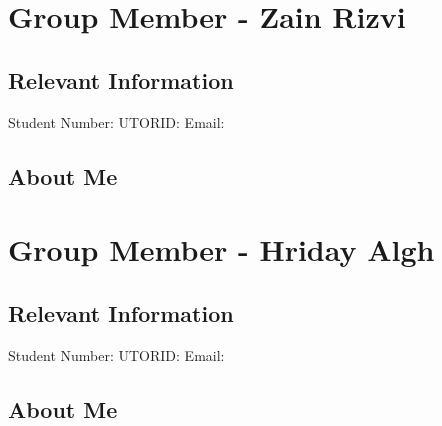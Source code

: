 \documentclass{article}
\begin{document}
\noindent\makebox[\linewidth]{\rule{\paperwidth}{0.4pt}}

\section{Group Member - Zain Rizvi}
\subsection{Relevant Information}
    Student Number:  \newline
    UTORID:  \newline
    Email: 
\subsection{About Me}

\noindent\makebox[\linewidth]{\rule{\paperwidth}{0.4pt}}

\section{Group Member - Hriday Algh}
\subsection{Relevant Information}
    Student Number:  \newline
    UTORID:  \newline
    Email: 
\subsection{About Me}
\end{document}
